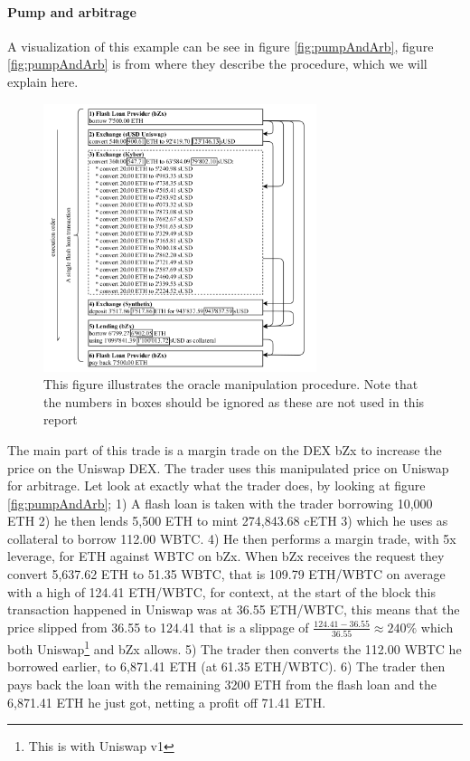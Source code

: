 \paragraph{Pump and arbitrage} A visualization of this example can be see in figure \ref{fig:pumpAndArb}, figure \ref{fig:pumpAndArb} is from \cite{attack} where they describe the procedure, which we will explain here.
\begin{figure}
  \centering
  \includegraphics[width=8cm]{assests/oracle}
  \caption{This figure illustrates the oracle manipulation procedure. Note that the numbers in boxes should be ignored as these are not used in this report \cite[p. 6 fig. 7]{attack}}
  \label{fig:oracle}
\end{figure}
The main part of this trade is a margin trade on the DEX bZx to increase the price on the Uniswap DEX. The trader uses this manipulated price on Uniswap for arbitrage. Let look at exactly what the trader does, by looking at figure \ref{fig:pumpAndArb}; 1) A flash loan is taken with the trader borrowing 10,000 ETH 2) he then lends 5,500 ETH to mint 274,843.68 cETH 3) which he uses as collateral to borrow 112.00 WBTC. 4) He then performs a margin trade, with 5x leverage, for ETH against WBTC on bZx. When bZx receives the request they convert 5,637.62 ETH to 51.35 WBTC, that is 109.79 ETH/WBTC on average with a high of 124.41 ETH/WBTC, for context, at the start of the block this transaction happened in Uniswap was at 36.55 ETH/WBTC, this means that the price slipped from 36.55 to 124.41 that is a slippage of $\frac{124.41-36.55}{36.55}\approx 240\%$ which both Uniswap\footnote{This is with Uniswap v1} and bZx allows. 5) The trader then converts the 112.00 WBTC he borrowed earlier, to 6,871.41 ETH (at 61.35 ETH/WBTC). 6) The trader then pays back the loan with the remaining 3200 ETH from the flash loan and the 6,871.41 ETH he just got, netting a profit off 71.41 ETH.

